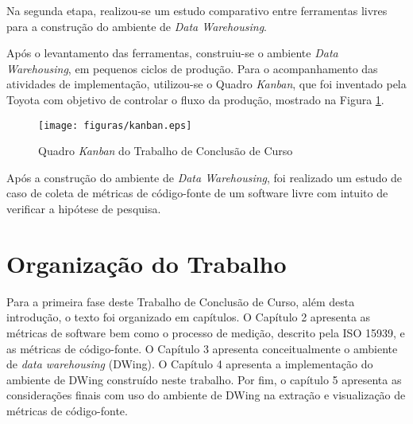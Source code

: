 Na segunda etapa, realizou-se um estudo comparativo entre ferramentas livres para a construção do ambiente de \textit{Data Warehousing}. 

Após o levantamento das ferramentas, construiu-se o ambiente \textit{Data Warehousing}, em pequenos ciclos de produção. Para o acompanhamento das atividades de implementação, utilizou-se o Quadro \textit{Kanban}, que foi inventado pela Toyota com objetivo de controlar o fluxo da produção, mostrado na Figura \ref{kanban}.


\begin{figure}[h]
\centering
         \texttt{[image: figuras/kanban.eps]}
         \caption{Quadro \textit{Kanban} do Trabalho de Conclusão de Curso}
         \label{kanban}
 \end{figure}

Após a construção do ambiente de \textit{Data Warehousing}, foi realizado um estudo de caso de coleta de métricas de código-fonte de um software livre com intuito de verificar a hipótese de pesquisa.


\section{Organização do Trabalho}

Para a primeira fase deste Trabalho de Conclusão de Curso, além desta 
introdução, o texto foi organizado em capítulos. O Capítulo 2 apresenta as 
métricas de software bem como o processo de medição, descrito pela ISO 15939, 
e as métricas de código-fonte. O Capítulo 3 
apresenta conceitualmente o ambiente de \textit{data warehousing} (DWing). O 
Capítulo 4 apresenta a implementação do ambiente de DWing construído neste 
trabalho. Por fim, o capítulo 5 apresenta as considerações finais com uso do 
ambiente de DWing na extração e visualização de métricas de código-fonte. 
